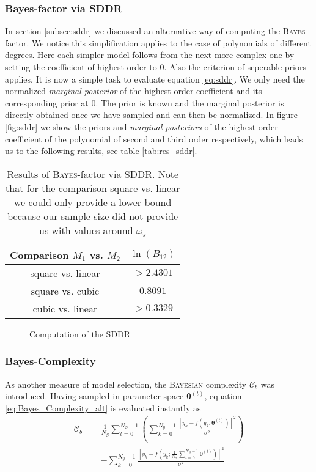 \documentclass[%
 reprint,
 amsmath,amssymb,
 aps,
]{revtex4-1}
\newcommand{\btheta}{\boldsymbol{\theta}}
\begin{document}
\subsubsection{\textbf{Bayes-factor via SDDR}}
In section \eqref{subsec:sddr} we discussed an alternative way of computing the \textsc{Bayes}-factor. We notice this simplification applies to the case of polynomials of different degrees. Here each simpler model follows from the next more complex one by setting the coefficient of highest order to $0$. Also the criterion of seperable priors applies. It is now a simple task to evaluate equation \eqref{eq:sddr}. We only need the normalized \emph{marginal posterior} of the highest order coefficient and its corresponding prior at $0$. The prior is known and the marginal posterior is directly obtained once we have sampled and can then be normalized. In figure \eqref{fig:sddr} we show the priors and \emph{marginal posteriors} of the highest order coefficient of the polynomial of second and third order respectively, which leads us to the following results, see table \eqref{tab:res_sddr}.

\begin{table}[htbp]
	{\renewcommand{\arraystretch}{1.3}
		\begin{tabular}{|c|c|}
			\hline
			Comparison $M_1$ vs. $M_2$ & $\ln(B_{12})$  \\
			\hline
			square vs. linear& $>2.4301$\\
			square vs. cubic&$0.8091$  \\
			cubic vs. linear & $>0.3329$\\
			\hline
	\end{tabular}}
	\caption{Results of \textsc{Bayes}-factor via SDDR. Note that for the comparison square vs. linear we could only provide a lower bound because our sample size did not provide us with values around $\omega_\star$ }
	\label{tab:res_sddr}
\end{table}
\begin{figure}
	\centering
	\caption{Computation of the SDDR}
	\label{fig:sddr}
\end{figure}
\subsubsection{\textbf{Bayes-Complexity}}
As another measure of model selection, the \textsc{Bayesian} complexity $\mathcal{C}_b$ was introduced. Having sampled in parameter space $\btheta^{(t)}$, equation \eqref{eq:Bayes_Complexity_alt} is evaluated instantly as \cite{wuerz} \begin{align*}\mathcal{C}_b=&\frac{1}{N_S}\sum_{t=0}^{N_S-1}\left(\sum_{k=0}^{N_y-1}\frac{[y_k-f(y_k;\btheta^{(t)})]^2}{\sigma^2}\right)\\&-\sum_{k=0}^{N_y-1}\frac{[y_k-f(y_k;\frac{1}{N_S}\sum_{t=0}^{N_S-1}\btheta^{(t)})]^2}{\sigma^2}\end{align*}
\end{document}
